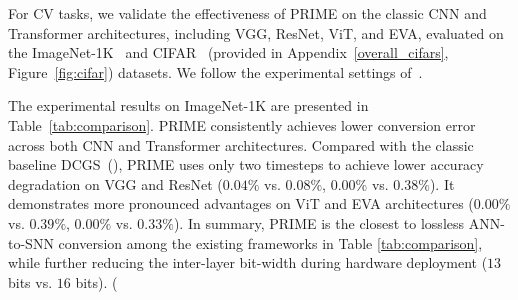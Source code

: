 For CV tasks, we validate the effectiveness of PRIME on the classic CNN and Transformer architectures, including VGG, ResNet, ViT, and EVA, evaluated on the ImageNet-1K~\cite{Imagenet} and CIFAR~\cite{cifar} (provided in Appendix~\ref{overall_cifars}, Figure~\ref{fig:cifar}) datasets. We follow the experimental settings of~\cite{ECMT}.



The experimental results on ImageNet-1K are presented in Table~\ref{tab:comparison}.  PRIME consistently achieves lower conversion error across both CNN and Transformer architectures. Compared with the classic baseline DCGS~(\cite{dcgs}), PRIME uses only two timesteps to achieve lower accuracy degradation on VGG and ResNet ($0.04\%$ vs. $0.08\%$, $0.00\%$ vs. $0.38\%$). It demonstrates more pronounced advantages on ViT and EVA architectures ($0.00\%$ vs. $0.39\%$, $0.00\%$ vs. $0.33\%$). In summary, PRIME is the closest to lossless ANN-to-SNN conversion among the existing frameworks in Table \ref{tab:comparison}, while further reducing the inter-layer bit-width during hardware deployment ($13$ bits vs. $16$ bits). (


